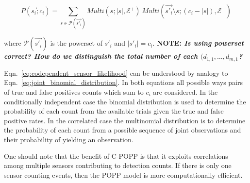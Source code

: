 \begin{equation}
\label{eq:codependent_sensor_likelihood}
P(\vec{s_i} ; c_i) = \sum\limits_{s \in \mathcal{P}(\vec{s'_i})} Multi(s ; |s|, \mathcal E^+) ~ Multi(\vec{s'_i}\setminus s ; (c_i - |s|), \mathcal E^-)
\end{equation}

\noindent where $\mathcal{P}(\vec{s'_i})$ is the powerset of $s'_i$ and $|s'_i| = c_i$. \textbf{NOTE: \emph{Is using powerset correct? How do we distinguish the total number of each $(d_{1,1}, \ldots, d_{m,1}$?}}

Eqn.~\ref{eq:codependent_sensor_likelihood} can be understood by analogy to Eqn.~\ref{eq:joint_binomial_distribution}. In both equations all possible ways pairs of true and false positives counts which sum to $c_i$ are considered. In the conditionally independent case the binomial distribution is used to determine the probability of each count from the available trials given the true and false positive rates. In the correlated case the multinomial distribution is to determine the probability of each count from a possible sequence of joint observations and their probability of yielding an observation.

One should note that the benefit of C-POPP is that it exploits correlations among multiple sensors contributing to detection counts. If there is only one sensor counting events, then the POPP model is more computationally efficient.
